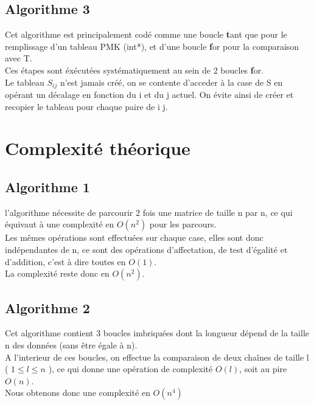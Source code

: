   \subsection{Algorithme 3}
	
	Cet algorithme est principalement codé comme une boucle {\textbf tant que} pour le remplissage d'un tableau PMK (int*), et d'une boucle {\textbf for} pour la comparaison avec T.\\
	
	Ces étapes sont éxécutées systématiquement au sein de 2 boucles {\textbf for}.\\
	
	Le tableau $S_{ij}$ n'est jamais créé, on se contente d'acceder à la case de S en opérant un décalage en fonction du i et du j actuel. On évite ainsi de créer et recopier le tableau pour chaque paire de i j.
	
\section{Complexité théorique}
  \subsection{Algorithme 1}
  l'algorithme nécessite de parcourir 2 fois une matrice de taille n par n, ce qui équivaut à une complexité en $O(n^2)$ pour les parcours.\\

  Les mêmes opérations sont effectuées sur chaque case, elles sont donc indépendantes de n, ce sont des opérations d'affectation, de test d'égalité et d'addition, c'est à dire toutes en $O(1)$.\\

  La complexité reste donc en $O(n^2)$.
  
  \subsection{Algorithme 2}
	Cet algorithme contient 3 boucles imbriquées dont la longueur dépend de la taille n des données (sans être égale à n).\\
	
	A l'interieur de ces boucles, on effectue la comparaison de deux chaînes de taille l ( $1 \leq l \leq n$ ), ce qui donne une opération de complexité $O(l)$, soit au pire $O(n)$.\\
	
	Nous obtenons donc une complexité en $O(n^4)$
	
